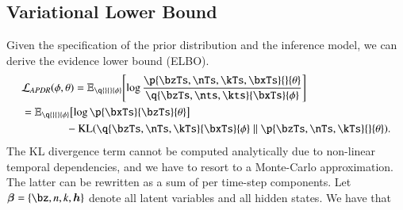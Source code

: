\subsection{Variational Lower Bound}
Given the specification of the prior distribution and the inference model, we can derive the evidence lower bound (ELBO).
\begin{equation}
\begin{aligned}
    &\loss[APDR]{\phi, \theta} = \expc{ \log \frac{ \p{\bzTs, \nTs, \kTs, \bxTs}{}{\theta} }{ \q{\bzTs, \nts, \kts}{\bxTs}{\phi} } }{}{ \q{}{}{\phi} }\\
    &= \expc{ \log \p{\bxTs}{\bzTs}{\theta} }{}{ \q{}{}{\phi} } \\
%    
    &\qquad \qquad - \kl{\q{\bzTs, \nTs, \kTs}{\bxTs}{\phi}}{\p{\bzTs, \nTs, \kTs}{}{\theta}}.
\end{aligned}
\end{equation}
The KL divergence term cannot be computed analytically due to non-linear temporal dependencies, and we have to resort to a Monte-Carlo approximation. The latter can be rewritten as a sum of per time-step components. 
Let $\bm{\beta} = \{ \bz, n, k, \bm{h} \}$ denote all latent variables and all hidden states. We have that 
